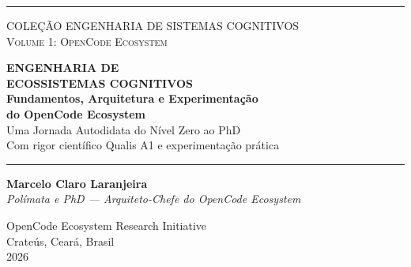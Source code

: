 \begin{capa}
    \centering
    
    \noindent
    \color{blue!70!black}\rule{\textwidth}{3pt}\par
    \vspace{0.5cm}
    
    {\large\scshape COLEÇÃO ENGENHARIA DE SISTEMAS COGNITIVOS}\\[0.2cm]
    {\small\scshape Volume 1: OpenCode Ecosystem}\par
    
    \vspace{1.5cm}
    
    {\Huge\bfseries\color{blue!60!black} ENGENHARIA DE}\\[0.2cm]
    {\Huge\bfseries\color{blue!60!black} ECOSSISTEMAS COGNITIVOS}\\[0.6cm]
    {\Large\bfseries\color{gray!70!black} Fundamentos, Arquitetura e Experimentação}\\[0.2cm]
    {\Large\bfseries\color{gray!70!black} do OpenCode Ecosystem}\\[1cm]
    
    {\large Uma Jornada Autodidata do Nível Zero ao PhD}\\[0.3cm]
    {\small Com rigor científico Qualis A1 e experimentação prática}\par
    
    \vspace{1.5cm}
    
    \noindent
    \color{blue!70!black}\rule[0.5ex]{10cm}{1.5pt}\par
    
    \vspace{1.2cm}
    
    {\large\bfseries Marcelo Claro Laranjeira}\\[0.2cm]
    {\small\textit{Polímata e PhD — Arquiteto-Chefe do OpenCode Ecosystem}}\par
    
    \vspace*{\fill}
    
    \begin{flushright}
    {\small OpenCode Ecosystem Research Initiative}\\[0.05cm]
    {\small Crateús, Ceará, Brasil}\\[0.05cm]
    {\small 2026}
    \end{flushright}
\end{capa}
